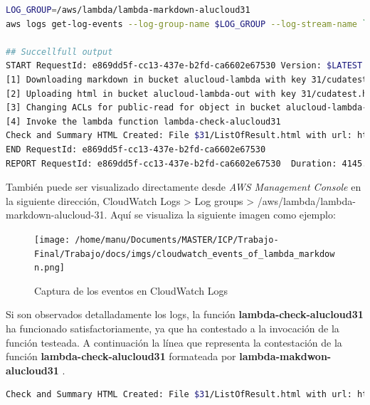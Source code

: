 \documentclass[
]{article}
\begin{document}
\begin{lstlisting}[language=bash,caption={Listar logs generados}]
LOG_GROUP=/aws/lambda/lambda-markdown-alucloud31
aws logs get-log-events --log-group-name $LOG_GROUP --log-stream-name `aws logs describe-log-streams --log-group-name $LOG_GROUP --max-items 1 --order-by LastEventTime --descending --query logStreams[].logStreamName --output text | head -n 1` --query events[].message --output text

## Succellfull output
START RequestId: e869dd5f-cc13-437e-b2fd-ca6602e67530 Version: $LATEST
[1] Downloading markdown in bucket alucloud-lambda with key 31/cudatest.md
[2] Uploading html in bucket alucloud-lambda-out with key 31/cudatest.html
[3] Changing ACLs for public-read for object in bucket alucloud-lambda-out with key 31/cudatest.html
[4] Invoke the lambda function lambda-check-alucloud31
Check and Summary HTML Created: File $31/ListOfResult.html with url: https://alucloud-lambda-out.s3.amazonaws.com/31/ListOfResult.html
END RequestId: e869dd5f-cc13-437e-b2fd-ca6602e67530
REPORT RequestId: e869dd5f-cc13-437e-b2fd-ca6602e67530	Duration: 4145.55 ms	Billed Duration: 4146 ms	Memory Size: 128 MB	Max Memory Used: 84 MB	Init Duration: 509.80 ms
\end{lstlisting}

También puede ser visualizado directamente desde \textit{AWS Management Console}
en la siguiente dirección, CloudWatch Logs \textgreater{} Log groups
\textgreater{} /aws/lambda/lambda-markdown-alucloud-31. Aquí se
visualiza la siguiente imagen como ejemplo:

\begin{figure}[H]
\centering
\texttt{[image: /home/manu/Documents/MASTER/ICP/Trabajo-Final/Trabajo/docs/imgs/cloudwatch\_events\_of\_lambda\_markdown.png]}
\caption{Captura de los eventos en CloudWatch Logs}
\end{figure}

Si son observados detalladamente los logs, la función
\textbf{lambda-check-alucloud31} ha funcionado satisfactoriamente, ya
que ha contestado a la invocación de la función testeada. A continuación
la línea que representa la contestación de la función
\textbf{lambda-check-alucloud31} formateada por \textbf{lambda-makdwon-alucloud31} .

\begin{lstlisting}[language=bash,caption={Respuesta}]
Check and Summary HTML Created: File $31/ListOfResult.html with url: https://alucloud-lambda-out.s3.amazonaws.com/31/ListOfResult.html
\end{lstlisting}
\end{document}
